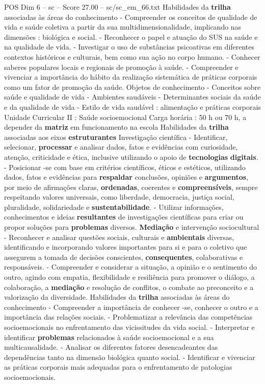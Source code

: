 \begin{textsample}{POS Dim 6 – sc – Score 27.00 – sc/sc\_em\_66.txt}
Habilidades da \textbf{trilha} associadas às áreas do conhecimento - Compreender os conceitos de qualidade de vida e saúde coletiva a partir da sua multidimensionalidade, implicando nas dimensões : biológica e social. - Reconhecer o papel e atuação do SUS na saúde e na qualidade de vida. - Investigar o uso de substâncias psicoativas em diferentes contextos históricos e culturais, bem como sua ação no corpo humano. - Conhecer saberes populares locais e regionais de promoção à saúde. - Compreender e vivenciar a importância do hábito da realização sistemática de práticas corporais como um fator de promoção da saúde.
Objetos de conhecimento - Conceitos sobre saúde e qualidade de vida - Ambientes saudáveis - Determinantes sociais da saúde e da qualidade de vida - Estilo de vida saudável : alimentação e práticas corporais Unidade Curricular II : Saúde socioemocional Carga horária : 50 h ou 70 h, a depender da \textbf{matriz} em funcionamento na escola Habilidades da \textbf{trilha} associadas aos eixos \textbf{estruturantes} Investigação científica - Identificar, selecionar, \textbf{processar} e analisar dados, fatos e evidências com curiosidade, atenção, criticidade e ética, inclusive utilizando o apoio de \textbf{tecnologias} \textbf{digitais}. - Posicionar -se com base em critérios científicos, éticos e estéticos, utilizando dados, fatos e evidências para \textbf{respaldar} conclusões, opiniões e \textbf{argumentos}, por meio de afirmações claras, \textbf{ordenadas}, coerentes e \textbf{compreensíveis}, sempre respeitando valores universais, como liberdade, democracia, justiça social, pluralidade, solidariedade e \textbf{sustentabilidade}. - Utilizar informações, conhecimentos e ideias \textbf{resultantes} de investigações científicas para criar ou propor soluções para \textbf{problemas} diversos. \textbf{Mediação} e intervenção sociocultural - Reconhecer e analisar questões sociais, culturais e \textbf{ambientais} diversas, identificando e incorporando valores importantes para si e para o coletivo que assegurem a tomada de decisões conscientes, \textbf{consequentes}, colaborativas e responsáveis. - Compreender e considerar a situação, a opinião e o sentimento do outro, agindo com empatia, flexibilidade e resiliência para promover o diálogo, a colaboração, a \textbf{mediação} e resolução de conflitos, o combate ao preconceito e a valorização da diversidade.
Habilidades da \textbf{trilha} associadas às áreas do conhecimento - Compreender a importância de conhecer -se, conhecer o outro e a importância das relações sociais. - Problematizar a relevância das competências socioemocionais no enfrentamento das vicissitudes da vida social. - Interpretar e identificar \textbf{problemas} relacionados à saúde socioemocional e a sua multicausalidade. - Analisar os diferentes fatores desencadeantes das dependências tanto na dimensão biológica quanto social. - Identificar e vivenciar as práticas corporais mais adequadas para o enfrentamento de patologias socioemocionais.

\end{textsample}
